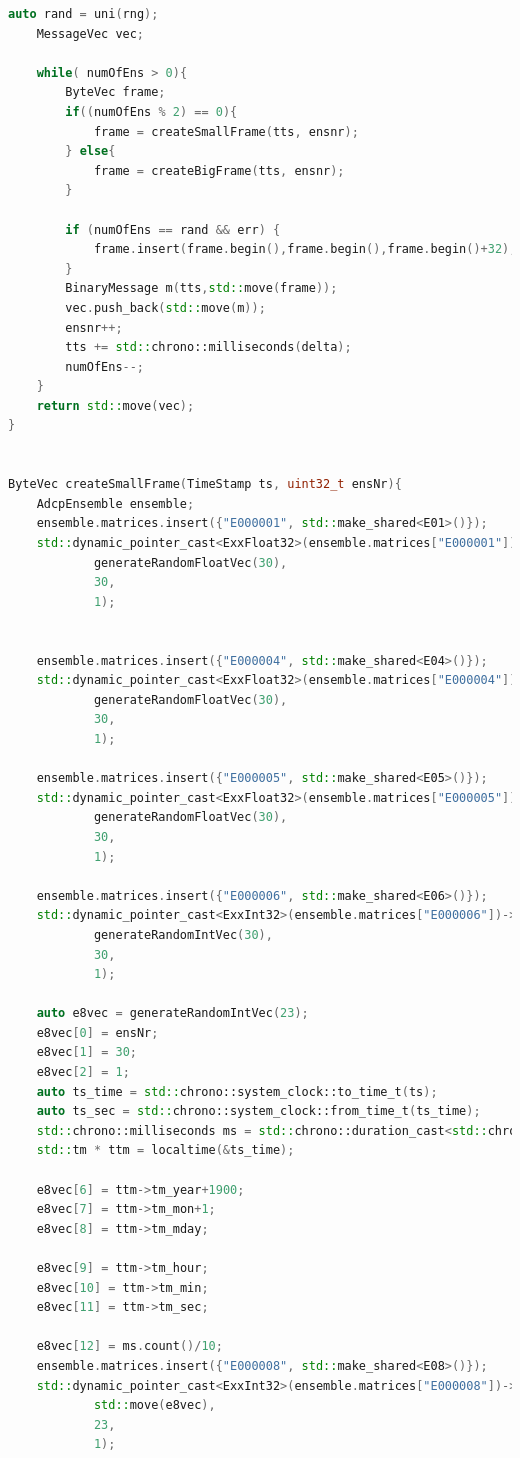 \begin{lstlisting}[language=C++]
    auto rand = uni(rng);
    MessageVec vec;

    while( numOfEns > 0){
        ByteVec frame;
        if((numOfEns % 2) == 0){
            frame = createSmallFrame(tts, ensnr);
        } else{
            frame = createBigFrame(tts, ensnr);
        }

        if (numOfEns == rand && err) {
            frame.insert(frame.begin(),frame.begin(),frame.begin()+32);
        }
        BinaryMessage m(tts,std::move(frame));
        vec.push_back(std::move(m));
        ensnr++;
        tts += std::chrono::milliseconds(delta);
        numOfEns--;
    }
    return std::move(vec);
}


ByteVec createSmallFrame(TimeStamp ts, uint32_t ensNr){
    AdcpEnsemble ensemble;
    ensemble.matrices.insert({"E000001", std::make_shared<E01>()});
    std::dynamic_pointer_cast<ExxFloat32>(ensemble.matrices["E000001"])->setVector(
            generateRandomFloatVec(30),
            30,
            1);


    ensemble.matrices.insert({"E000004", std::make_shared<E04>()});
    std::dynamic_pointer_cast<ExxFloat32>(ensemble.matrices["E000004"])->setVector(
            generateRandomFloatVec(30),
            30,
            1);

    ensemble.matrices.insert({"E000005", std::make_shared<E05>()});
    std::dynamic_pointer_cast<ExxFloat32>(ensemble.matrices["E000005"])->setVector(
            generateRandomFloatVec(30),
            30,
            1);

    ensemble.matrices.insert({"E000006", std::make_shared<E06>()});
    std::dynamic_pointer_cast<ExxInt32>(ensemble.matrices["E000006"])->setVector(
            generateRandomIntVec(30),
            30,
            1);

    auto e8vec = generateRandomIntVec(23);
    e8vec[0] = ensNr;
    e8vec[1] = 30;
    e8vec[2] = 1;
    auto ts_time = std::chrono::system_clock::to_time_t(ts);
    auto ts_sec = std::chrono::system_clock::from_time_t(ts_time);
    std::chrono::milliseconds ms = std::chrono::duration_cast<std::chrono::milliseconds>(ts - ts_sec);
    std::tm * ttm = localtime(&ts_time);

    e8vec[6] = ttm->tm_year+1900;
    e8vec[7] = ttm->tm_mon+1;
    e8vec[8] = ttm->tm_mday;

    e8vec[9] = ttm->tm_hour;
    e8vec[10] = ttm->tm_min;
    e8vec[11] = ttm->tm_sec;

    e8vec[12] = ms.count()/10;
    ensemble.matrices.insert({"E000008", std::make_shared<E08>()});
    std::dynamic_pointer_cast<ExxInt32>(ensemble.matrices["E000008"])->setVector(
            std::move(e8vec),
            23,
            1);


\end{lstlisting}
